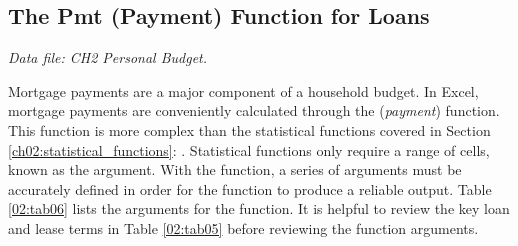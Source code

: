 \subsection{The Pmt (Payment) Function for Loans}

\textit{Data file: CH2 Personal Budget.}

Mortgage payments are a major component of a household budget. In Excel, mortgage payments are conveniently calculated through the  (\textit{payment}) function. This function is more complex than the statistical functions covered in Section \ref{ch02:statistical_functions}: . Statistical functions only require a range of cells, known as the argument. With the  function, a series of arguments must be accurately defined in order for the function to produce a reliable output. Table \ref{02:tab06} lists the arguments for the  function. It is helpful to review the key loan and lease terms in Table \ref{02:tab05} before reviewing the  function arguments.

